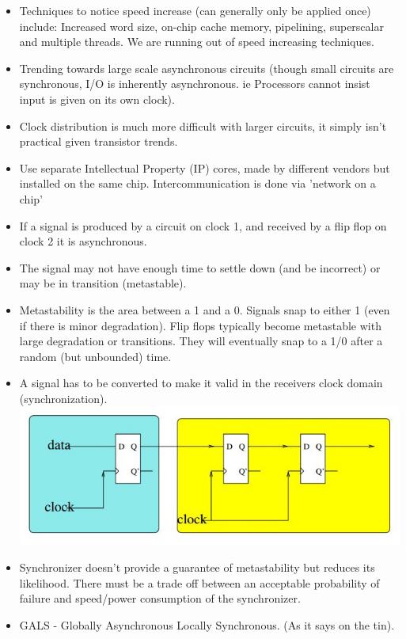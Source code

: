 \documentclass{article}
\begin{document}
\begin{itemize}
\item Techniques to notice speed increase (can generally only be applied once) include: Increased word size, on-chip cache memory, pipelining, superscalar and multiple threads. We are running out of speed increasing techniques.
\item Trending towards large scale asynchronous circuits (though small circuits are synchronous, I/O is inherently asynchronous. ie Processors cannot insist input is given on its own clock).
\item Clock distribution is much more difficult with larger circuits, it simply isn't practical given transistor trends.
\item Use separate Intellectual Property (IP) cores, made by different vendors but installed on the same chip. Intercommunication is done via 'network on a chip'
\item If a signal is produced by a circuit on clock 1, and received by a flip flop on clock 2 it is asynchronous.
\item The signal may not have enough time to settle down (and be incorrect) or may be in transition (metastable).
\item Metastability is the area between a 1 and a 0. Signals snap to either 1 (even if there is minor degradation). Flip flops typically become metastable with large degradation or transitions. They will eventually snap to a 1/0 after a random (but unbounded) time.
\item A signal has to be converted to make it valid in the receivers clock domain (synchronization).
\\
\includegraphics[width=\linewidth]{syncer}
\item Synchronizer doesn't provide a guarantee of metastability but reduces its likelihood. There must be a trade off between an acceptable probability of failure and speed/power consumption of the synchronizer.
\item GALS - Globally Asynchronous Locally Synchronous. (As it says on the tin).
\end{itemize}
\end{document}

